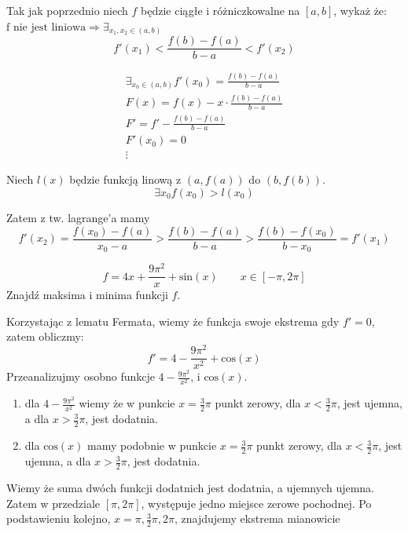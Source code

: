 \documentclass[11pt]{scrartcl}
\begin{document}
  \begin{zadanie}
      Tak jak poprzednio niech $f$ będzie ciągłe i różniczkowalne na $\left [ a, b \right ]$, wykaż że:
      $\text{f nie jest liniowa} \Rightarrow \exists_{x_{1}, x_{2} \in (a,b)} $
      \[
          f'(x_{1}) < \frac{f(b) - f(a)}{b - a} < f'(x_{2})
      \]
      
  \end{zadanie}

  \begin{gather*}
  \exists_{x_{0} \in (a,b)} f'(x_{0}) = \frac{f(b) - f(a)}{b -a} \\
  F(x) = f(x) - x \cdot \frac{f(b) - f(a)}{b-a} \\
  F' = f' - \frac{f(b) - f(a)}{b - a} \\
  F'(x_{0}) = 0 \\ 
  \vdots
  \end{gather*}
  
  Niech $l(x)$ będzie funkcją linową z $\left ( a, f(a) \right )$ do $\left ( b, f(b) \right )$.
  \[
    \exists{x_{0}} f(x_{0}) > l(x_{0})
  \]
  
  Zatem z tw. lagrange'a mamy
  \[
      f'(x_{2}) = \frac{f(x_{0}) - f(a)}{x_{0} -a} > \frac{f(b) - f(a)}{b - a} > \frac{f(b) - f(x_{0})}{b - x_{0}} = f'(x_{1})
  \]
  
  \begin{zaddom}
     \[
       f = 4x +  \frac{9 \pi^2}{x} + \text{sin} \left ( x \right ) \qquad x \in \left [ - \pi , 2 \pi  \right ]
    \]
    Znajdź maksima i minima funkcji $f$.
  \end{zaddom}
    Korzystając z lematu Fermata, wiemy że funkcja swoje ekstrema gdy $f' = 0$, zatem obliczmy:
    \[
      f' = 4 - \frac{9\pi^2 }{x^2} + \text{cos} \left ( x \right )
    \]
    Przeanalizujmy osobno funkcje $4 - \frac{9 \pi^2}{x^2}$, i $\text{cos} \left ( x \right ) $.
    \begin{enumerate}
        \item dla $4 - \frac{9\pi^2}{x^2}$ wiemy że w punkcie $x = \frac{3}{2} \pi $ punkt zerowy, dla $x < \frac{3}{2} \pi $, jest ujemna, a dla $x > \frac{3}{2} \pi $, jest dodatnia.
        \item dla $\text{cos} \left ( x \right ) $ mamy podobnie w punkcie $x = \frac{3}{2} \pi $ punkt zerowy, dla $x < \frac{3}{2} \pi $, jest ujemna, a dla $x > \frac{3}{2} \pi $, jest dodatnia. 
    \end{enumerate}
    
    Wiemy że suma dwóch funkcji dodatnich jest dodatnia, a ujemnych ujemna. Zatem w przedziale $\left [ \pi , 2\pi  \right ]$, występuje jedno miejsce zerowe pochodnej. Po podstawieniu kolejno, $x = \pi, \frac{3}{2} \pi , 2\pi  $, znajdujemy ekstrema mianowicie 
\end{document}
